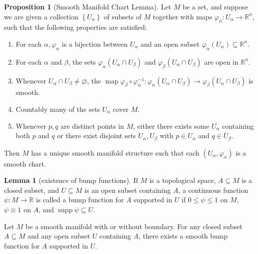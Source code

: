 \documentclass[12pt,a4paper]{book}
\newenvironment{enu}{\begin{enumerate}[(1)]}{\end{enumerate}}
\theoremstyle{definition}
\newtheorem{lem}[defn]{Lemma}
\newtheorem{prop}[defn]{Proposition}
\begin{document}
\begin{prop}[Smooth Manifold Chart Lemma]
    Let $M$ be a set, and suppose we are given a collection $\left\{U_\alpha\right\}$ of subsets of $M$ together with maps $\varphi_\alpha: U_\alpha \rightarrow \mathbb{R}^n$, such that the following properties are satisfied:
    \begin{enu}
        \item For each $\alpha, \varphi_\alpha$ is a bijection between $U_\alpha$ and an open subset $\varphi_\alpha\left(U_\alpha\right) \subseteq \mathbb{R}^n$.
        \item For each $\alpha$ and $\beta$, the sets $\varphi_\alpha\left(U_\alpha \cap U_\beta\right)$ and $\varphi_\beta\left(U_\alpha \cap U_\beta\right)$ are open in $\mathbb{R}^n$.
        \item Whenever $U_\alpha \cap U_\beta \neq \varnothing$, the $\operatorname{map} \varphi_\beta \circ \varphi_\alpha^{-1}: \varphi_\alpha\left(U_\alpha \cap U_\beta\right) \rightarrow \varphi_\beta\left(U_\alpha \cap U_\beta\right)$ is smooth.
        \item  Countably many of the sets $U_\alpha$ cover $M$.
        \item  Whenever $p, q$ are distinct points in $M$, either there exists some $U_\alpha$ containing both $p$ and $q$ or there exist disjoint sets $U_\alpha, U_\beta$ with $p \in U_\alpha$ and $q \in U_\beta$.
    \end{enu}
    Then $M$ has a unique smooth manifold structure such that each $\left(U_\alpha, \varphi_\alpha\right)$ is a smooth chart.
\end{prop}
\begin{lem}[existence of bump functions]
    If $M$ is a topological space, $A \subseteq M$ is a closed subset, and $U \subseteq M$ is an open subset containing $A$, a continuous function $\psi: M \rightarrow \mathbb{R}$ is
    called a bump function for $A$ supported in $U$ if $0 \leq \psi \leq 1$ on $M$, $\psi \equiv 1$ on $A$, and $\operatorname{supp} \psi \subseteq U$.

    Let $M$ be a smooth manifold with or without boundary. For any closed subset $A \subseteq M$ and any open subset $U$ containing $A$, there exists a smooth bump function for $A$ supported in $U$.
    \label{lemma:existence of bump function}
\end{lem}
\end{document}
